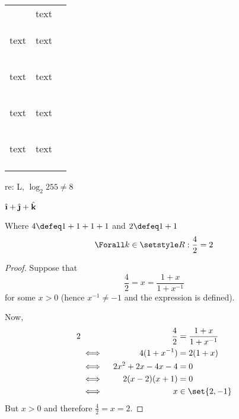 \begin{longtable}{*3c}
\begin{tabular}{*2c}
\begin{large}text\end{large} &
{\large text} \\
\begin{Large}text\end{Large} &
{\Large text} \\
\begin{LARGE}text\end{LARGE} &
{\LARGE text} \\
\begin{huge}text\end{huge} &
{\huge text} \\
\begin{Huge}text\end{Huge} &
{\Huge text} \\
\end{tabular} \\
\end{longtable}

re: L, \(\log_2 255 \ne 8\)

\(\uveci + \uvecj + \uveck\)

\begin{lemma}
Where \(4 \defeq 1 + 1 + 1 + 1\) and \(2 \defeq 1 + 1\)
\begin{equation}
\Forall k \in \Reals: \frac 42 = 2
\end{equation}
\end{lemma}

\begin{proof}
Suppose that
\begin{equation*}
\frac 42 = x = \frac{1 + x}{1 + x^{-1}}
\end{equation*}
for some \(x > 0\) (hence \(x^{-1} \neq -1\) and the expression is defined).

Now,
\begin{alignat*} 2
 &&\frac 42 &= \frac{1 + x}{1 + x^{-1}} \\
 &\iff{}& 4(1 + x^{-1}) &= 2(1 + x) \\
 &\iff{}& 2x^2 + 2x - 4x - 4 &= 0 \\
 &\iff{}& 2(x - 2)(x + 1) &= 0 \\
 &\iff{}& x &\in \set{2, -1} 
\end{alignat*}
But \(x > 0\) and therefore \(\frac 42 = x = 2\).
\end{proof}

